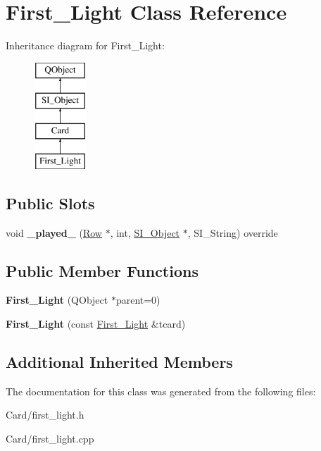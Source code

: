 \hypertarget{class_first___light}{}\section{First\+\_\+\+Light Class Reference}
\label{class_first___light}
Inheritance diagram for First\+\_\+\+Light\+:\begin{figure}[H]
\begin{center}
\leavevmode
\includegraphics[height=4.000000cm]{class_first___light}
\end{center}
\end{figure}
\subsection*{Public Slots}
\begin{DoxyCompactItemize}
\item 
\mbox{\label{class_first___light_ac404b92611f6abdbe9a2637d0aedddc6}} 
void {\bfseries \+\_\+played\+\_\+} (\hyperlink{class_card_set}{Row} $\ast$, int, \hyperlink{class_s_i___object}{S\+I\+\_\+\+Object} $\ast$, S\+I\+\_\+\+String) override
\end{DoxyCompactItemize}
\subsection*{Public Member Functions}
\begin{DoxyCompactItemize}
\item 
\mbox{\label{class_first___light_ad8528940b21d4b17db59cbfc160947be}} 
{\bfseries First\+\_\+\+Light} (Q\+Object $\ast$parent=0)
\item 
\mbox{\label{class_first___light_ac9f88596f360e0213cf2beed13ad5590}} 
{\bfseries First\+\_\+\+Light} (const \hyperlink{class_first___light}{First\+\_\+\+Light} \&tcard)
\end{DoxyCompactItemize}
\subsection*{Additional Inherited Members}


The documentation for this class was generated from the following files\+:\begin{DoxyCompactItemize}
\item 
Card/first\+\_\+light.\+h\item 
Card/first\+\_\+light.\+cpp\end{DoxyCompactItemize}
